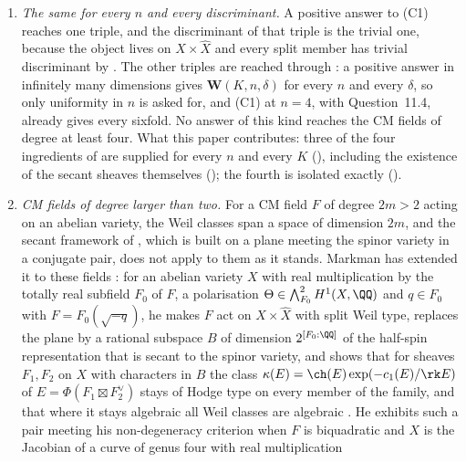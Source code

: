 \begin{enumerate}[label=\textup{(C\arabic*)},leftmargin=3.0em,itemsep=4pt]
  Hilbert--Burch resolution split into powers of $\Theta$ or into simple
  semi-homogeneous bundles (\cite[Theorem~4.89]{paperII}, \cite[Theorem~4.92]{paperII}), and
  no complete intersection occurs (\cite[Theorem~4.81]{paperII}).
\item \emph{The same for every $n$ and every discriminant.} A positive answer
  to (C1) reaches one triple, and the discriminant of that triple is the
  trivial one, because the object lives on $X\times\widehat X$ and every split
  member has trivial discriminant by \cite[Proposition~15.19(ii)]{paperI}. The other
  triples are reached through : a positive answer in
  infinitely many dimensions gives $\mathbf{W}(K,n,\delta)$ for every $n$ and
  every $\delta$, so only uniformity in $n$ is asked for, and (C1) at $n=4$,
  with Question~11.4, already gives every sixfold. No answer of this kind
  reaches the CM fields of degree at least four. What this paper
  contributes: three of the four ingredients of \cite[Question~13.7]{paperI} are supplied
  for every $n$ and every $K$ (\cite[Theorem~14.15]{paperI}), including the
  existence of the secant sheaves themselves (\cite[Theorem~14.13]{paperI}); the
  fourth is isolated exactly (\cite[Remark~14.16]{paperI}).
\item \emph{CM fields of degree larger than two.} For a CM field $F$ of
  degree $2m>2$ acting on an abelian variety, the Weil classes span a space of
  dimension $2m$, and the secant framework of \cite[Section~14]{paperI}, which
  is built on a plane meeting the spinor variety in a conjugate pair, does not
  apply to them as it stands. Markman has extended it to these fields
  \cite{Mar25c}: for an abelian variety $X$ with real multiplication by the
  totally real subfield $F_{0}$ of $F$, a polarisation
  $\Theta\in\bigwedge^{2}_{F_{0}}H^{1}(X,\QQ)$ and $q\in F_{0}$ with
  $F=F_{0}(\sqrt{-q})$, he makes $F$ act on $X\times\widehat{X}$ with split
  Weil type, replaces the plane by a rational subspace $B$ of dimension
  $2^{[F_{0}:\QQ]}$ of the half-spin representation that is secant to the
  spinor variety, and shows that for sheaves $F_{1},F_{2}$ on $X$ with
  characters in $B$ the class $\kappa(E)=\ch(E)\exp(-c_{1}(E)/\rk E)$ of
  $E=\Phi(F_{1}\boxtimes F_{2}^{\vee})$ stays of Hodge type on every member
  of the family, and that where it stays algebraic all Weil classes are
  algebraic \cite[Theorem~1.1.2, Proposition~10.2.1]{Mar25c}. He exhibits
  such a pair meeting his non-degeneracy criterion when $F$ is biquadratic
  and $X$ is the Jacobian of a curve of genus four with real multiplication

\end{enumerate}
